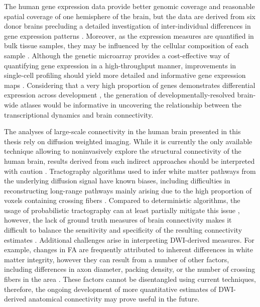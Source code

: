 The human gene expression data provide better genomic coverage and reasonable spatial coverage of one hemisphere of the brain, but the data are derived from six donor brains precluding a detailed investigation of inter-individual differences in gene expression patterns \citep{Arnatkeviciute2019,Hawrylycz2015}. Moreover, as the expression measures are quantified in bulk tissue samples, they may be influenced by the cellular composition of each sample \citep{Tasic2016}. Although the genetic microarray  provides a cost-effective way of quantifying gene expression in a high-throughput manner, improvements in single-cell profiling should yield more detailed and informative gene expression maps \citep{Lein2017}. Considering that a very high proportion of genes demonstrates differential expression across development \citep{Colantuoni2011}, the generation of developmentally-resolved brain-wide atlases would be informative in uncovering the relationship between the transcriptional dynamics and brain connectivity.

The analyses of large-scale connectivity in the human brain presented in this thesis rely on diffusion weighted imaging. While it is currently the only available technique allowing to noninvasively explore the structural connectivity of the human brain, results derived from such indirect approaches should be interpreted with caution \citep{Jones2013,Sotiropoulos2017}. Tractography algorithms used to infer white matter pathways from the underlying diffusion signal have known biases, including difficulties in reconstructing long-range pathways \citep{Jones2010} mainly arising due to the high proportion of voxels containing crossing fibers \citep{Jeurissen2001}. Compared to deterministic algorithms, the usage of probabilistic tractography can at least partially mitigate this issue \citep{Tournier2010}, however, the lack of ground truth measures of brain connectivity makes it difficult to balance the sensitivity and specificity of the resulting connectivity estimates \mbox{\citep{Zalesky2016}}. Additional challenges arise in interpreting DWI-derived measures. For example, changes in FA are frequently attributed to inherent differences in white matter integrity, however they can result from a number of other factors, including differences in axon diameter, packing density, or the number of crossing fibers in the area \citep{Jones2013,Takahashi2002}. These factors cannot be disentangled using current techniques, therefore, the ongoing development of more quantitative estimates of DWI-derived anatomical connectivity \citep{Bouhrara2016,Zhang2012} may prove useful in the future.

